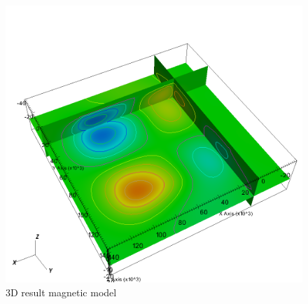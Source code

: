 \begin{figure}
\centering
\includegraphics[width=\textwidth]{joint3D4mag6grav-m.png}
\caption{3D result magnetic model}
\label{fig:joint3D4mag6grav-m}
\end{figure}

